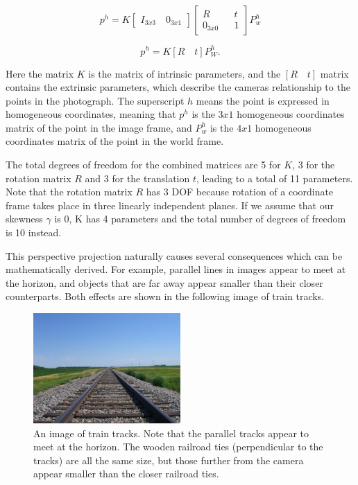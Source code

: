 \documentclass[]{article}
\begin{document}
 \begin{equation}
p^h
=
K \begin{bmatrix}
I_{3x3} \quad 0_{3x1}
\end{bmatrix}
\begin{bmatrix}
R && t \\
0_{3x0} && 1
\end{bmatrix}
P_w^h
 \end{equation}
 
 \begin{equation}
 p^h = K[R \quad t] P_W^h.
 \end{equation}

Here the matrix $K$ is the matrix of intrinsic parameters, and the $[R \quad t]$ matrix contains the extrinsic parameters, which describe the cameras relationship to the points in the photograph. The superscript $h$ means the point is expressed in homogeneous coordinates, meaning that $p^h$ is the $3x1$ homogeneous coordinates matrix of the point in the image frame, and $P_w^h$ is the $4x1$ homogeneous coordinates matrix of the point in the world frame. 

The total degrees of freedom for the combined matrices are 5 for $K$, 3 for the rotation matrix $R$ and 3 for the translation $t$, leading to a total of 11 parameters. Note that the rotation matrix $R$ has 3 DOF because rotation of a coordinate frame takes place in three linearly independent planes. If we assume that our skewness $\gamma$ is 0, K has 4 parameters and the total number of degrees of freedom is 10 instead.

This perspective projection naturally causes several consequences which can be mathematically derived. For example, parallel lines in images appear to meet at the horizon, and objects that are far away appear smaller than their closer counterparts. Both effects are shown in the following image of train tracks.

\begin{figure}[H]
\includegraphics[width=0.5\textwidth]{traintracks.jpg}
\centering
\caption{An image of train tracks. Note that the parallel tracks appear to meet at the horizon. The wooden railroad ties (perpendicular to the tracks) are all the same size, but those further from the camera appear smaller than the closer railroad ties. }
\label{fig:train_tracks}
\end{figure}
\end{document}
